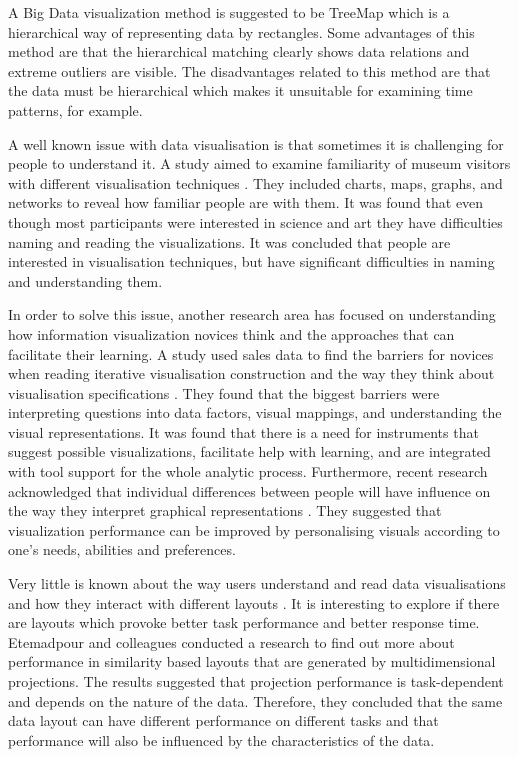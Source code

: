 \documentclass{l4proj}
\begin{document}
A Big Data visualization method is suggested to be TreeMap \cite{gorodov2013analytical} which is a hierarchical way of representing data by rectangles. Some advantages of this method are that the hierarchical matching clearly shows data relations and extreme outliers are visible. The disadvantages related to this method are that the data must be hierarchical which makes it unsuitable for examining time patterns, for example. 

A well known issue with data visualisation is that sometimes it is challenging for people to understand it. A study aimed to examine familiarity of museum visitors with different visualisation techniques \cite{borner2015investigating}. They included charts, maps, graphs, and networks to reveal how familiar people are with them. It was found that even though most participants were interested in science and art they have difficulties naming and reading the visualizations. It was concluded that people are interested in visualisation techniques, but have significant difficulties in naming and understanding them. 

In order to solve this issue, another research area has focused on understanding how information visualization novices think and the approaches that can facilitate their learning. A study used sales data to find the barriers for novices when reading iterative visualisation construction and the way they think about visualisation specifications \cite{grammel2010information}. They found that the biggest barriers were interpreting questions into data factors, visual mappings, and understanding the visual representations. It was found that there is a need for instruments that suggest possible visualizations, facilitate help with learning, and are integrated with tool support for the whole analytic process. Furthermore, recent research acknowledged that individual differences between people will have influence on the way they interpret graphical representations \cite{Steichen:2013:UIV:2449396.2449439}. They suggested that visualization performance can be improved by personalising visuals according to one's needs, abilities and preferences.

Very little is known about the way users understand and read data visualisations and how they interact with different layouts \cite{etemadpour2015perception}. It is interesting to explore if there are layouts which provoke better task performance and better response time. Etemadpour and colleagues \cite{etemadpour2015perception} conducted a research to find out more about performance in similarity based layouts that are generated by multidimensional projections. The results suggested that projection performance is task-dependent and depends on the nature of the data. Therefore, they concluded that the same data layout can have different performance on different tasks and that performance will also be influenced by the characteristics of the data.
\end{document}
